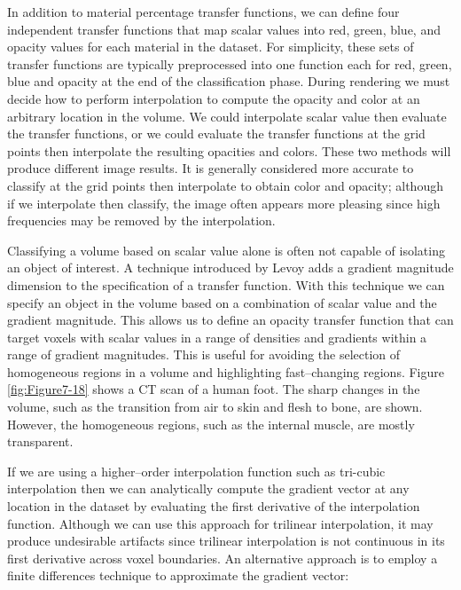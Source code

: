 In addition to material percentage transfer functions, we can define four independent transfer functions that map scalar values into red, green, blue, and opacity values for each material in the dataset. For simplicity, these sets of transfer functions are typically preprocessed into one function each for red, green, blue and opacity at the end of the classification phase. During rendering we must decide how to perform interpolation to compute the opacity and color at an arbitrary location in the volume. We could interpolate scalar value then evaluate the transfer functions, or we could evaluate the transfer functions at the grid points then interpolate the resulting opacities and colors. These two methods will produce different image results. It is generally considered more accurate to classify at the grid points then interpolate to obtain color and opacity; although if we interpolate then classify, the image often appears more pleasing since high frequencies may be removed by the interpolation.

Classifying a volume based on scalar value alone is often not capable of isolating an object of interest. A technique introduced by Levoy \cite{Levoy88} adds a gradient magnitude dimension to the specification of a transfer function. With this technique we can specify an object in the volume based on a combination of scalar value and the gradient magnitude. This allows us to define an opacity transfer function that can target voxels with scalar values in a range of densities and gradients within a range of gradient magnitudes. This is useful for avoiding the selection of homogeneous regions in a volume and highlighting fast--changing regions. Figure \ref{fig:Figure7-18} shows a CT scan of a human foot. The sharp changes in the volume, such as the transition from air to skin and flesh to bone, are shown. However, the homogeneous regions, such as the internal muscle, are mostly transparent.

If we are using a higher--order interpolation function such as tri-cubic interpolation then we can analytically compute the gradient vector at any location in the dataset by evaluating the first derivative of the interpolation function. Although we can use this approach for trilinear interpolation, it may produce undesirable artifacts since trilinear interpolation is not continuous in its first derivative across voxel boundaries. An alternative approach is to employ a finite differences technique to approximate the gradient vector:

